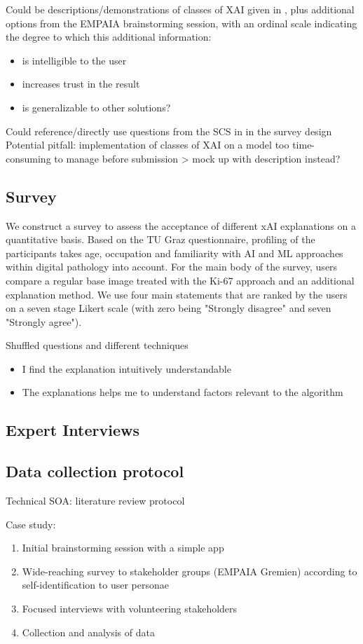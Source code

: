 Could be descriptions/demonstrations of classes of XAI given in \cite{poceviciute_survey_2020}, plus additional options from the EMPAIA brainstorming session, with an ordinal scale indicating the degree to which this additional information:

\begin{itemize}
 \item is intelligible to the user
 \item increases trust in the result
 \item is generalizable to other solutions?
\end{itemize}

Could reference/directly use questions from the SCS in \cite{HolzingerEtAl:2020:QualityOfExplanations} in the survey design
Potential pitfall: implementation of classes of XAI on a model too time-consuming to manage before submission > mock up with description instead?

\subsection{Survey}

We construct a survey to assess the acceptance of different xAI explanations on a quantitative basis. Based on the TU Graz questionnaire, profiling of the participants takes age, occupation and familiarity with AI and ML approaches within digital pathology into account. For the main body of the survey, users compare a regular base image treated with the Ki-67 approach and an additional explanation method. We use four main statements that are ranked by the users on a seven stage Likert scale (with zero being "Strongly disagree" and seven "Strongly agree"). 

Shuffled questions and different techniques

\begin{itemize}
    \item I find the explanation intuitively understandable
    \item The explanations helps me to understand factors relevant to the algorithm
\end{itemize}



\subsection{Expert Interviews}

\subsection{Data collection protocol}
Technical SOA: literature review protocol

Case study:
\begin{enumerate}
    \item Initial brainstorming session with a simple app
\item  Wide-reaching survey to stakeholder groups (EMPAIA Gremien) according to self-identification to user personae
\item  Focused interviews with volunteering stakeholders
\item  Collection and analysis of data
\end{enumerate}

